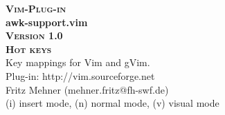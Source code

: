 \documentclass[oneside,10pt,landscape,DIV17]{scrartcl}
\newcommand{\Pluginversion}{1.0}
\begin{document}
%

\begin{multicols}{3}
%
\begin{center}
%
\textbf{\textsc{\small{Vim-Plug-in}}}\\
\textbf{\LARGE{awk-support.vim}}\\
\textbf{\textsc{\small{Version \Pluginversion}}}\\
\vspace{5mm}%
\textbf{\textsc{\Huge{Hot keys}}}\\ 
\vspace{5mm}%
Key mappings for Vim and gVim.\\
Plug-in: http://vim.sourceforge.net\\
Fritz Mehner (mehner.fritz@fh-swf.de)\\
\vspace{1.0mm}
{\normalsize (i)} insert mode, {\normalsize (n)} normal mode, {\normalsize (v)} visual mode\\
\vspace{4.0mm}


\end{center}
\end{multicols}
\end{document}
